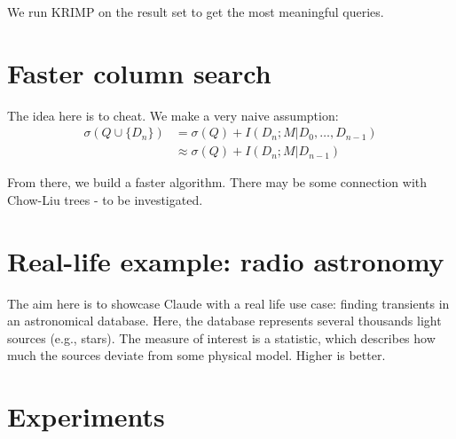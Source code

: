 We run KRIMP on the result set to get the most meaningful queries.


\section{Faster column search}

The idea here is to cheat. We make a very naive assumption:
\[
\begin{split}
    \sigma(Q \cup \{D_n\}) & = \sigma(Q) + I(D_n ; M | D_0, \ldots, D_{n-1})\\
                           & \approx \sigma(Q) + I(D_n ; M | D_{n-1})
\end{split}
\]

From there, we build a faster algorithm. There may be some connection with
Chow-Liu trees - to be investigated.



\section{Real-life example: radio astronomy}

The aim here is to showcase Claude with a real life use case: finding
transients in an astronomical database. Here, the database represents several
thousands light sources (e.g., stars). The measure of interest is a statistic,
which describes how much the sources deviate from some physical model. Higher
is better.


\section{Experiments}
